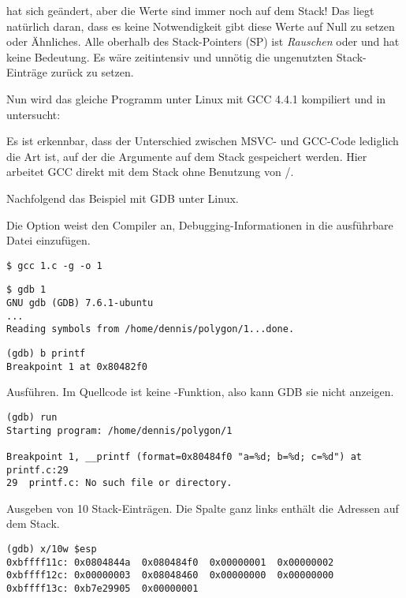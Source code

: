 \ESP hat sich geändert, aber die Werte sind immer noch auf dem Stack!
Das liegt natürlich daran, dass es keine Notwendigkeit gibt diese Werte auf Null zu setzen oder Ähnliches.
Alle oberhalb des Stack-Pointers (\ac{SP}) ist \emph{Rauschen} oder \emph{\garbage{}} und hat keine Bedeutung.
Es wäre zeitintensiv und unnötig die ungenutzten Stack-Einträge zurück zu setzen.


Nun wird das gleiche Programm unter Linux mit GCC 4.4.1 kompiliert und in \IDA untersucht:



Es ist erkennbar, dass der Unterschied zwischen MSVC- und GCC-Code lediglich die Art ist,
auf der die Argumente auf dem Stack gespeichert werden.
Hier arbeitet GCC direkt mit dem Stack ohne Benutzung von \PUSH/\POP.


Nachfolgend das Beispiel mit \ac{GDB} unter Linux.

Die Option  weist den Compiler an, Debugging-Informationen in die ausführbare Datei einzufügen.

\begin{lstlisting}
$ gcc 1.c -g -o 1
\end{lstlisting}

\begin{lstlisting}
$ gdb 1
GNU gdb (GDB) 7.6.1-ubuntu
...
Reading symbols from /home/dennis/polygon/1...done.
\end{lstlisting}

\begin{lstlisting}[caption=Setzen eines Breakpoints auf \printf]
(gdb) b printf
Breakpoint 1 at 0x80482f0
\end{lstlisting}

Ausführen.
Im Quellcode ist keine \printf-Funktion, also kann \ac{GDB} sie nicht anzeigen.

\begin{lstlisting}
(gdb) run
Starting program: /home/dennis/polygon/1 

Breakpoint 1, __printf (format=0x80484f0 "a=%d; b=%d; c=%d") at printf.c:29
29	printf.c: No such file or directory.
\end{lstlisting}

Ausgeben von 10 Stack-Einträgen. Die Spalte ganz links enthält die Adressen auf dem Stack.

\begin{lstlisting}
(gdb) x/10w $esp
0xbffff11c:	0x0804844a	0x080484f0	0x00000001	0x00000002
0xbffff12c:	0x00000003	0x08048460	0x00000000	0x00000000
0xbffff13c:	0xb7e29905	0x00000001
\end{lstlisting}

